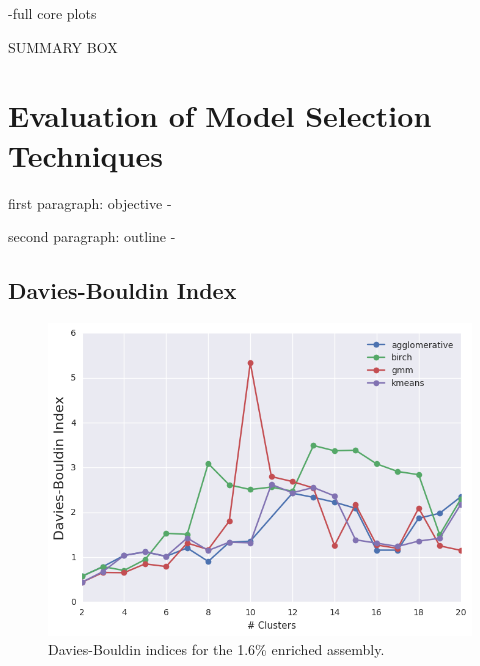 \clearpage

-full core plots

SUMMARY BOX


\section{Evaluation of Model Selection Techniques}
\label{sec:chap11-model-select}

first paragraph: objective
-

second paragraph: outline
-

\subsection{Davies-Bouldin Index}
\label{subsec:chap11-db-index}

\begin{figure}[h!]
\centering
\includegraphics[width=0.87\linewidth]{figures/results/model-select/assm-16/db-combined-U238-capture-1}
\vspace{2mm}
\caption[Davies-Bouldin indices for the 1.6\% enriched assembly]{Davies-Bouldin indices for the 1.6\% enriched assembly.}
\label{fig:chap11-assm-16-db-index}
\end{figure}

